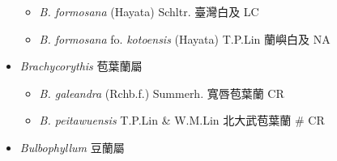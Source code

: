 \begin{itemize}
  \begin{itemize}
        \item[] \textit{B. formosana} (Hayata) Schltr.  臺灣白及   LC
        \item[] \textit{B. formosana} fo. \textit{kotoensis} (Hayata) T.P.Lin  蘭嶼白及   NA
  \end{itemize}
 \item[] \textit{Brachycorythis} 苞葉蘭屬
                                
  \begin{itemize}
        \item[] \textit{B. galeandra} (Rchb.f.) Summerh.  寬唇苞葉蘭   CR
        \item[] \textit{B. peitawuensis} T.P.Lin \& W.M.Lin  北大武苞葉蘭  \# CR
  \end{itemize}
 \item[] \textit{Bulbophyllum} 豆蘭屬
                                

\end{itemize}
